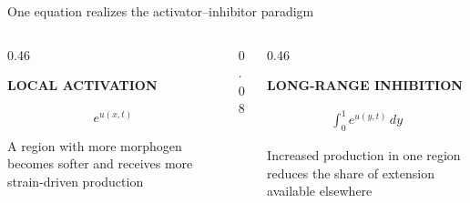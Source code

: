 \begin{frame}{One equation realizes the activator--inhibitor paradigm}

  \vspace{-0.05cm}

  \begin{columns}[c,onlytextwidth]
    \begin{column}{0.46\textwidth}
      \centering
      {\color{HydraGold}\bfseries\fontsize{8.2}{9.8}\selectfont
        LOCAL ACTIVATION\par}
      \vspace{-0.18cm}
      {\color{HydraWhite}\fontsize{12.2}{15.3}\selectfont
      \begin{align*}
        e^{u(x,t)}
      \end{align*}
      }
      \par
      \vspace{-0.26cm}
      {\color{HydraMuted}\fontsize{7.5}{9.2}\selectfont
        A region with more morphogen becomes softer and receives more strain-driven production
      \par}
    \end{column}

    \begin{column}{0.08\textwidth}
      \centering{\color{HydraLine}\rule{0.6pt}{2.6cm}}
    \end{column}

    \begin{column}{0.46\textwidth}
      \centering
      {\color{HydraCyan}\bfseries\fontsize{8.2}{9.8}\selectfont
        LONG-RANGE INHIBITION\par}
      \vspace{-0.18cm}
      {\color{HydraWhite}\fontsize{12.2}{15.3}\selectfont
      \begin{align*}
        \int_0^1e^{u(y,t)}\,dy
      \end{align*}
      }
      \par
      \vspace{-0.26cm}
      {\color{HydraMuted}\fontsize{7.5}{9.2}\selectfont
        Increased production in one region reduces the share of extension available elsewhere
      \par}
    \end{column}
  \end{columns}

  \vspace{0.54cm}

\end{frame}


